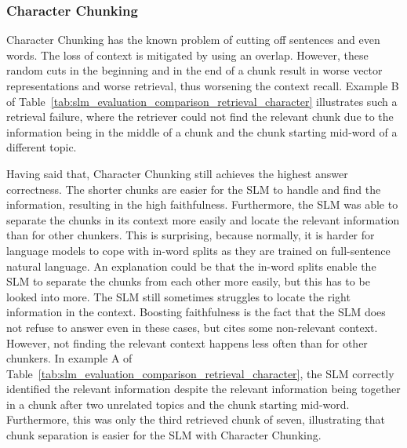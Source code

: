 \documentclass[12pt]{article} %
\begin{document}
\subsubsection{Character Chunking}
Character Chunking has the known problem of cutting off sentences and even words. The loss of context is mitigated by using an overlap. However, these random cuts in the beginning and in the end of a chunk result in worse vector representations and worse retrieval, thus worsening the context recall. Example B of Table~\ref{tab:slm_evaluation_comparison_retrieval_character} illustrates such a retrieval failure, where the retriever could not find the relevant chunk due to the information being in the middle of a chunk and the chunk starting mid-word of a different topic.

Having said that, Character Chunking still achieves the highest answer correctness. The shorter chunks are easier for the SLM to handle and find the information, resulting in the high faithfulness. Furthermore, the SLM was able to separate the chunks in its context more easily and locate the relevant information than for other chunkers. This is surprising, because normally, it is harder for language models to cope with in-word splits as they are trained on full-sentence natural language. An explanation could be that the in-word splits enable the SLM to separate the chunks from each other more easily, but this has to be looked into more. The SLM still sometimes struggles to locate the right information in the context. Boosting faithfulness is the fact that the SLM does not refuse to answer even in these cases, but cites some non-relevant context. However, not finding the relevant context happens less often than for other chunkers. In example A of Table~\ref{tab:slm_evaluation_comparison_retrieval_character}, the SLM correctly identified the relevant information despite the relevant information being together in a chunk after two unrelated topics and the chunk starting mid-word. Furthermore, this was only the third retrieved chunk of seven, illustrating that chunk separation is easier for the SLM with Character Chunking.
\end{document}
